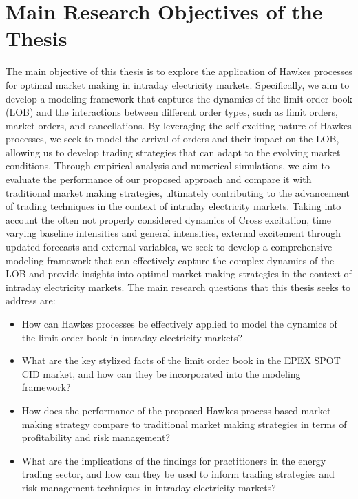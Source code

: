 \documentclass[12pt,a4paper]{cau_thesis}
\begin{document}
\section{Main Research Objectives of the Thesis}\label{sec:main_research_objectives}
The main objective of this thesis is to explore the application of
Hawkes processes for optimal market making in intraday electricity
markets. Specifically, we aim to develop a modeling framework that
captures the dynamics of the limit order book (LOB) and the
interactions between different order types, such as limit orders,
market orders, and cancellations. By leveraging the self-exciting
nature of Hawkes processes, we seek to model the arrival of orders
and their impact on the LOB, allowing us to develop trading
strategies that can adapt to the evolving market conditions. Through
empirical analysis and numerical simulations, we aim to evaluate the
performance of our proposed approach and compare it with traditional
market making strategies, ultimately contributing to the advancement
of trading techniques in the context of intraday electricity markets.
Taking into account the often not properly considered dynamics of
Cross excitation, time varying baseline intensities and general
intensities, external excitement through updated forecasts and
external variables, we seek to develop a comprehensive modeling
framework that can effectively capture the complex dynamics of the
LOB and provide insights into optimal market making strategies in the
context of intraday electricity markets. The main research questions
that this thesis seeks to address are:
\begin{itemize}
    \item How can Hawkes processes be effectively applied to model the dynamics
          of the limit order book in intraday electricity markets?
    \item What are the key stylized facts of the limit order book in the EPEX
          SPOT CID market, and how can they be incorporated into the modeling
          framework?
    \item How does the performance of the proposed Hawkes process-based market
          making strategy compare to traditional market making strategies in
          terms of profitability and risk management?
    \item What are the implications of the findings for practitioners in the
          energy trading sector, and how can they be used to inform trading
          strategies and risk management techniques in intraday electricity
          markets?
\end{itemize}
\end{document}
